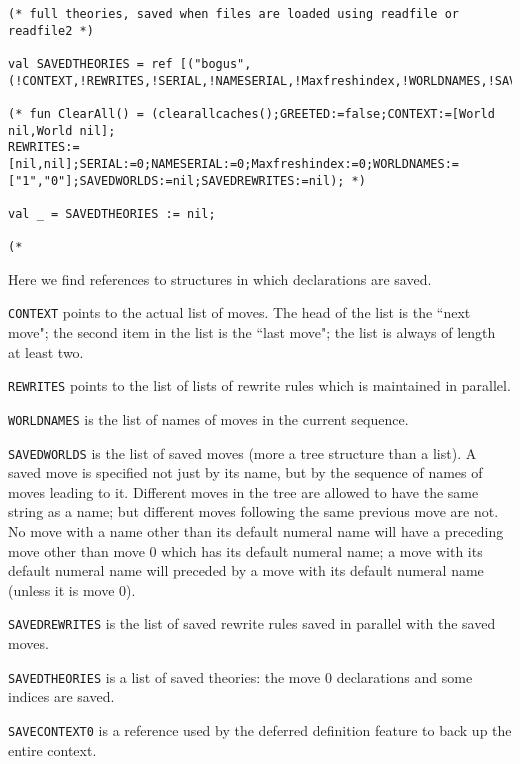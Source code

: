 \documentclass{article}
\begin{document}
\begin{verbatim}
(* full theories, saved when files are loaded using readfile or readfile2 *)

val SAVEDTHEORIES = ref [("bogus",(!CONTEXT,!REWRITES,!SERIAL,!NAMESERIAL,!Maxfreshindex,!WORLDNAMES,!SAVEDWORLDS,!SAVEDREWRITES))];

(* fun ClearAll() = (clearallcaches();GREETED:=false;CONTEXT:=[World nil,World nil];
REWRITES:=[nil,nil];SERIAL:=0;NAMESERIAL:=0;Maxfreshindex:=0;WORLDNAMES:=["1","0"];SAVEDWORLDS:=nil;SAVEDREWRITES:=nil); *)

val _ = SAVEDTHEORIES := nil;

(*

\end{verbatim}

Here we find references to structures in which declarations are saved.

{\tt CONTEXT} points to the actual list of moves.  The head of the list is the ``next move";  the second item in the list is the ``last move";  the list is always of length at least two.

{\tt REWRITES} points to the list of lists of rewrite rules which is maintained in parallel.

{\tt WORLDNAMES} is the list of names of moves in the current sequence.

{\tt SAVEDWORLDS} is the list of saved moves (more a tree structure than a list).  A saved move is specified not just by its name, but by the sequence of names of moves leading to it.  Different moves in the tree are allowed to have the same string as a name;  but different moves following the same previous move are not.   No move with a  name other than its default numeral name will have a preceding move other than move 0 which has its default numeral name; a move with its default numeral name will preceded by a move with its default numeral name (unless it is move 0).

{\tt SAVEDREWRITES} is the list of saved rewrite rules saved in parallel with the saved moves.

{\tt SAVEDTHEORIES} is a list of saved theories:  the move 0 declarations and some indices are saved.

{\tt SAVECONTEXT0} is a reference used by the deferred definition feature to back up the entire context.
\end{document}
